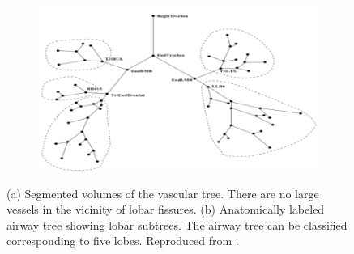 \begin{figure}[htbp]
\begin{subfigure}{.43\linewidth}
  \includegraphics[width=\linewidth,trim={{.0\wd0} {.0\wd0} {.0\wd0} {.0\wd0}},clip]{Segmentation/Image/LabelledAirwayTree.png}
  \caption{}
  \label{fig:AnatomicalBasedSegmentation-b} 
\end{subfigure}
\caption{(a) Segmented volumes of the vascular tree. There are no large vessels in the vicinity of lobar fissures. (b) Anatomically labeled airway tree showing lobar subtrees. The airway tree can be classified corresponding to five lobes. Reproduced from \citep{ukil2009anatomy}.}
\label{fig:AnatomicalBasedSegmentation}
\end{figure}

